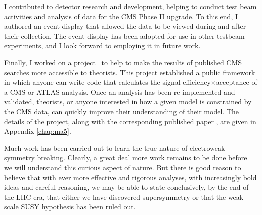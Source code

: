 I contributed to detector research and development, helping to conduct test beam activities and analysis of data for the CMS Phase II upgrade. To this end, I authored an event display that allowed the data to be viewed during and after their collection. The event display has been adopted for use in other testbeam experiments, and I look forward to employing it in future work.

Finally, I worked on a project~\cite{Dumont:2014tja} to help to make the results of published CMS searches more accessible to theorists. This project established a public framework in which anyone can write code that calculates the signal efficiency$\times$acceptance of a CMS or ATLAS analysis.  Once an analysis has been re-implemented and validated, theorists, or anyone interested in how a given model is constrained by the CMS data, can quickly improve their understanding of their model. The details of the project, along with the corresponding published paper \cite{Dumont:2014tja}, are given in Appendix \ref{chap:ma5}.

Much work has been carried out to learn the true nature of electroweak symmetry breaking. Clearly, a great deal more work remains to be done before we will understand this curious aspect of nature. But there is good reason to believe that with ever more effective and rigorous analyses, with increasingly bold ideas and careful reasoning, we may be able to state conclusively, by the end of the LHC era, that either we have discovered supersymmetry or that the weak-scale SUSY hypothesis has been ruled out.

